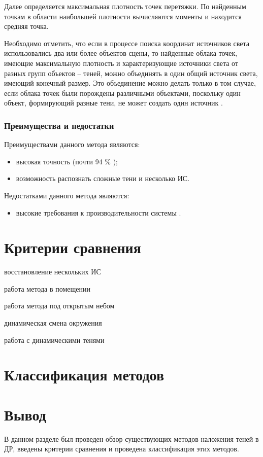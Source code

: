 Далее определяется максимальная плотность точек перетяжки. По найденным точкам в области наибольшей плотности вычисляются моменты и находится средняя точка.

Необходимо отметить, что если в процессе поиска координат источников света использовались два или более объектов сцены, то найденные облака точек, имеющие максимальную плотность и характеризующие источники света от разных групп объектов – теней, можно объединять в один общий источник света, имеющий конечный размер. Это объединение можно делать только в том случае, если облака точек были порождены различными объектами, поскольку один объект, формирующий разные тени, не может создать один источник \cite{sns_tras}.

\subsubsection*{Преимущества и недостатки}

Преимуществами данного метода являются:

\begin{itemize}
	\item высокая точность (почти 94 \% \cite{sns_tras});
	\item возможность распознать сложные тени и несколько ИС.
\end{itemize}

Недостатками данного метода являются:

\begin{itemize}
	\item высокие требования к производительности системы \cite{tras}.
\end{itemize}

\section{Критерии сравнения}

восстановление нескольких ИС

работа метода в помещении

работа метода под открытым небом

динамическая смена окружения


работа с динамическими тенями

\section{Классификация методов}



\section*{Вывод}

В данном разделе был проведен обзор существующих методов наложения теней в ДР, введены критерии сравнения и проведена классификация этих методов.